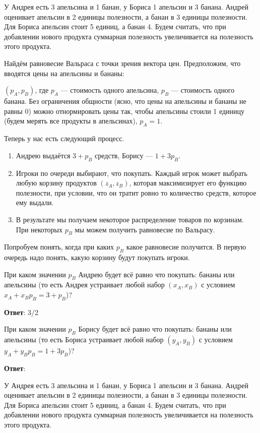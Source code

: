 \task
У Андрея есть 3 апельсина и 1 банан, у Бориса 1 апельсин и 3 банана. Андрей оценивает апельсин в 2 единицы полезности, а банан в 3 единицы полезности. Для Бориса апельсин стоит 5 единиц, а банан 4. Будем считать, что при добавлении нового продукта суммарная полезность увеличивается на полезность этого продукта.

Найдём равновесие Вальраса с точки зрения вектора цен. Предположим, что вводятся цены на апельсины и бананы:

$(p_A,p_B)$, где $p_A$ --- стоимость одного апельсина, $p_B$ --- стоимость одного банана. Без ограничения общности (ясно, что цены на апельсины и бананы не равны 0) можно отнормировать цены так, чтобы апельсины стоили 1 единицу (будем мерять все продукты в апельсинах), $p_A=1$.

Теперь у нас есть следующий процесс.

\begin{enumerate}
	\item Андрею выдаётся $3+p_B$ средств, Борису --- $1+3p_B$.
	\item Игроки по очереди выбирают, что покупать. Каждый игрок может выбрать любую корзину продуктов $(z_A,z_B)$, которая максимизирует его функцию полезности, при условии, что он тратит ровно то количество средств, которое ему выдали.
	\item В результате мы получаем некоторое распределение товаров по корзинам. При некоторых $p_B$ мы можем получить равновесие по Вальрасу.
\end{enumerate}
	Попробуем понять, когда при каких $p_B$ какое равновесие получится. В первую очередь надо понять, какую корзину будут покупать игроки.
	
	При каком значении $p_B$ Андрею будет всё равно что покупать: бананы или апельсины (то есть Андрея устраивает любой набор $(x_A,x_B)$ с условием $x_A + x_B p_B = 3 + p_B$)?
	
\textbf{Ответ}:
3/2	%

\task
При каком значении $p_B$ Борису будет всё равно что покупать: бананы или апельсины (то есть Бориса устраивает любой набор $(y_A,y_B)$ с условием $y_A + y_Bp_B = 1 + 3p_B$)?

\textbf{Ответ}: 

\task
У Андрея есть 3 апельсина и 1 банан, у Бориса 1 апельсин и 3 банана. Андрей оценивает апельсин в 2 единицы полезности, а банан в 3 единицы полезности. Для Бориса апельсин стоит 5 единиц, а банан 4. Будем считать, что при добавлении нового продукта суммарная полезность увеличивается на полезность этого продукта.

